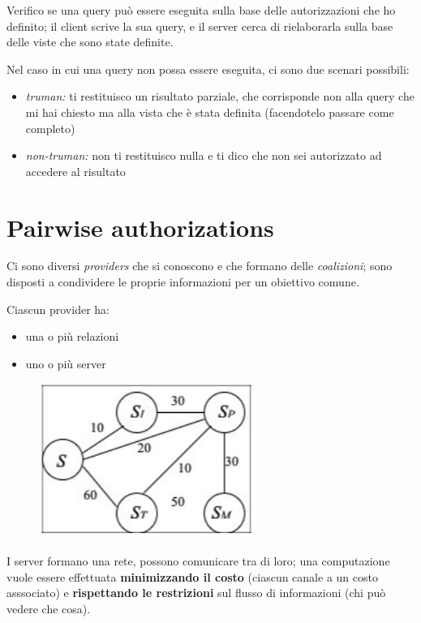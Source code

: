 \documentclass{report}
\begin{document}
\noindent Verifico se una query può essere eseguita sulla base delle autorizzazioni che 
ho definito; il client scrive la sua query, e il server cerca di rielaborarla 
sulla base delle viste che sono state definite.

\noindent Nel caso in cui una query non possa essere eseguita, ci sono due scenari possibili:
\begin{itemize}
    \item \textit{truman:} ti restituisco un risultato parziale, che corrisponde non alla query che mi hai chiesto ma alla vista che è stata definita (facendotelo 
    passare come completo)
    \item \textit{non-truman:} non ti restituisco nulla e ti dico che non sei autorizzato ad accedere al risultato 
\end{itemize}


\section{Pairwise authorizations}
Ci sono diversi \textit{providers} che si conoscono e che formano delle \textit{coalizioni}; sono 
disposti a condividere le proprie informazioni per un obiettivo comune.

\noindent Ciascun provider ha:
\begin{itemize}
    \item una o più relazioni 
    \item uno o più server
\end{itemize}

\begin{figure}[H]
    \centering
    \includegraphics[width=0.4\linewidth]{images/pairwise-auth.png}
\end{figure}

\noindent I server formano una rete, possono comunicare tra di loro; una computazione vuole essere effettuata 
\textbf{minimizzando il costo} (ciascun canale a un costo asssociato) e \textbf{rispettando le restrizioni} 
sul flusso di informazioni (chi può vedere che cosa).
\end{document}
